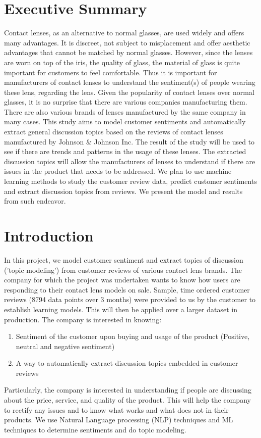\documentclass[11pt, letterpaper]{article}
\begin{document}
\section*{Executive Summary}
Contact lenses, as an alternative to normal glasses, are used widely and offers many advantages. It is discreet, not subject to misplacement and offer aesthetic advantages that cannot be matched by normal glasses. However, since the lenses are worn on top of the iris, the quality of glass, the material of glass is quite important for customers to feel comfortable. Thus it is important for manufacturers of contact lenses to understand the sentiment(s) of people wearing these lens, regarding the lens. Given the popularity of contact lenses over normal glasses, it is no surprise that there are various companies manufacturing them. There are also various brands of lenses manufactured by the same company in many cases. This study aims to model customer sentiments and automatically extract general discussion topics based on the reviews of contact lenses manufactured by Johnson \& Johnson Inc. The result of the study will be used to see if there are trends and patterns in the usage of these lenses. The extracted discussion topics will allow the manufacturers of lenses to understand if there are issues in the product that needs to be addressed. We plan to use machine learning methods to study the customer review data, predict customer sentiments and extract discussion topics from reviews. We present the model and results from such endeavor.
 

\newpage
\tableofcontents
\newpage

\section {Introduction}
In this project, we model customer sentiment and extract topics of discussion ('topic modeling') from customer reviews of various contact lens brands. The company for which the project was undertaken wants to know how users are responding to their contact lens models on sale. Sample, time ordered customer reviews (8794 data points over 3 months) were provided to us by the customer to establish learning models. This will then be applied over a larger dataset in production. The company is interested in knowing:
\begin{enumerate}
    \item Sentiment of the customer upon buying and usage of the product (Positive, neutral and negative sentiment)
    \item A way to automatically extract discussion topics embedded in customer reviews \label{topicmodeling}
\end{enumerate}
Particularly, the company is interested in understanding if people are discussing about the price, service, and quality of the product. This will help the company to rectify any issues and to know what works and what does not in their products. We use Natural Language processing (NLP) techniques and ML techniques to determine sentiments and do topic modeling.
\end{document}

